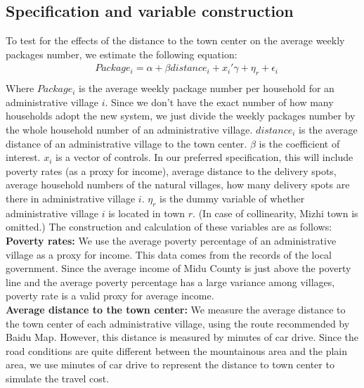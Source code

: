 \documentclass{article}
\begin{document}
\subsection{Specification and variable construction}
To test for the effects of the distance to the town center on the average weekly packages number, we estimate the following equation:\\
\begin{equation*}
    \begin{aligned}
        & Package_i=\alpha+\beta distance_i+x_i'\gamma+\eta_{r}+\epsilon_i\\
    \end{aligned}
\end{equation*}
\mbox{\hspace{2em}}
Where $Package_i$ is the average weekly package number per household for an administrative village $i$. Since we don’t have the exact number of how many households adopt the new system, we just divide the weekly packages number by the whole household number of an administrative village. $distance_i$ is the average distance of an administrative village to the town center. $\beta$ is the coefficient of interest. $x_i$ is a vector of controls. In our preferred specification, this will include poverty rates (as a proxy for income), average distance to the delivery spots, average household numbers of the natural villages, how many delivery spots are there in administrative village $i$. $\eta_r$ is the dummy variable of whether administrative village $i$ is located in town $r$. (In case of collinearity, Mizhi town is omitted.) The construction and calculation of these variables are as follows:\\
{\bfseries Poverty rates:} We use the average poverty percentage of an administrative village as a proxy for income. This data comes from the records of the local government. Since the average income of Midu County is just above the poverty line and the average poverty percentage has a large variance among villages, poverty rate is a valid proxy for average income.\\
{\bfseries Average distance to the town center:} We measure the average distance to the town center of each administrative village, using the route recommended by Baidu Map. However, this distance is measured by minutes of car drive. Since the road conditions are quite different between the mountainous area and the plain area, we use minutes of car drive to represent the distance to town center to simulate the travel cost.\\
\end{document}

